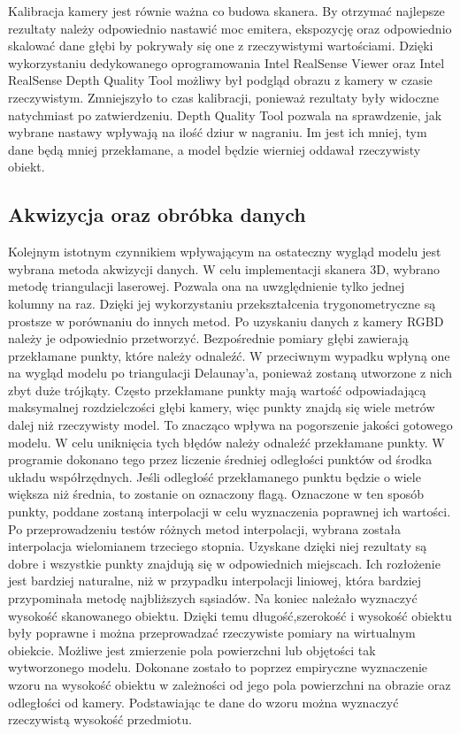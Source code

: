 Kalibracja kamery jest równie ważna co budowa skanera. By otrzymać najlepsze rezultaty należy odpowiednio nastawić moc emitera, ekspozycję oraz odpowiednio skalować dane głębi by pokrywały się one z rzeczywistymi wartościami. Dzięki wykorzystaniu dedykowanego oprogramowania Intel RealSense Viewer oraz Intel RealSense Depth Quality Tool możliwy był podgląd obrazu z kamery w czasie rzeczywistym. Zmniejszyło to czas kalibracji, ponieważ rezultaty były widoczne natychmiast po zatwierdzeniu. Depth Quality Tool pozwala na sprawdzenie, jak wybrane nastawy wpływają na ilość dziur w nagraniu. Im jest ich mniej, tym dane będą mniej przekłamane, a model będzie wierniej oddawał rzeczywisty obiekt.
\subsection{Akwizycja oraz obróbka danych}
Kolejnym istotnym czynnikiem wpływającym na ostateczny wygląd modelu jest wybrana metoda akwizycji danych. W celu implementacji skanera 3D, wybrano metodę triangulacji laserowej. Pozwala ona na uwzględnienie tylko jednej kolumny na raz. Dzięki jej wykorzystaniu przekształcenia trygonometryczne są prostsze w porównaniu do innych metod. Po uzyskaniu danych z kamery RGBD należy je odpowiednio przetworzyć. Bezpośrednie pomiary głębi zawierają przekłamane punkty, które należy odnaleźć. W przeciwnym wypadku wpłyną one na wygląd modelu po triangulacji Delaunay'a, ponieważ zostaną utworzone z nich zbyt duże trójkąty. Często przekłamane punkty mają wartość odpowiadającą maksymalnej rozdzielczości głębi kamery, więc punkty znajdą się wiele metrów dalej niż rzeczywisty model. To znacząco wpływa na pogorszenie jakości gotowego modelu. W celu uniknięcia tych błędów należy odnaleźć przekłamane punkty. W programie dokonano tego przez liczenie średniej odległości punktów od środka układu współrzędnych. Jeśli odległość przekłamanego punktu będzie o wiele większa niż średnia, to zostanie on oznaczony flagą. Oznaczone w ten sposób punkty, poddane zostaną interpolacji w celu wyznaczenia poprawnej ich wartości.
\newline \indent Po przeprowadzeniu testów różnych metod interpolacji, wybrana została interpolacja wielomianem trzeciego stopnia. Uzyskane dzięki niej rezultaty są dobre i wszystkie punkty znajdują się w odpowiednich miejscach. Ich rozłożenie jest bardziej naturalne, niż w przypadku interpolacji liniowej, która bardziej przypominała metodę najbliższych sąsiadów.
\newline \indent Na koniec należało wyznaczyć wysokość skanowanego obiektu. Dzięki temu długość,szerokość i wysokość obiektu były poprawne i można przeprowadzać rzeczywiste pomiary na wirtualnym obiekcie. Możliwe jest zmierzenie pola powierzchni lub objętości tak wytworzonego modelu. Dokonane zostało to poprzez empiryczne wyznaczenie wzoru na wysokość obiektu w zależności od jego pola powierzchni na obrazie oraz odległości od kamery. Podstawiając te dane do wzoru można wyznaczyć rzeczywistą wysokość przedmiotu.

